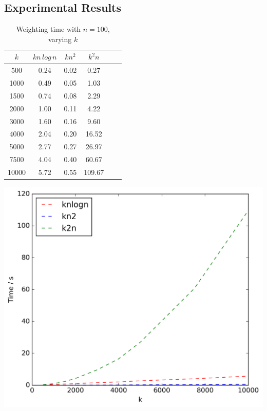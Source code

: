 \documentclass{article}
\begin{document}
    \subsection{Experimental Results}
    \label{subsec:results}

    \begin{table}[!ht]
        \captionsetup{font=footnotesize,justification=justified,margin=0cm}
        \small
        \begin{minipage}{0.48\textwidth}
            \centering
            \caption{Weighting time with $n = 100$, varying $k$}
            \label{tab:weightk}
            \begin{tabular}{c||ccccc}
                $k$ & $kn\,log\,n$ & $kn^2$ & $k^2n$\\
                \hline\hline
                500 & 0.24 & 0.02 & 0.27\\
                1000 & 0.49 & 0.05 & 1.03\\
                1500 & 0.74 & 0.08 & 2.29\\
                2000 & 1.00 & 0.11 & 4.22\\
                3000 & 1.60 & 0.16 & 9.60\\
                4000 & 2.04 & 0.20 & 16.52\\
                5000 & 2.77 & 0.27 & 26.97\\
                7500 & 4.04 & 0.40 & 60.67\\
                10000 & 5.72 & 0.55 & 109.67\\
            \end{tabular}
            \includegraphics[scale=0.4]{varyingk1_weighting}

\end{minipage}
\end{table}
\end{document}
